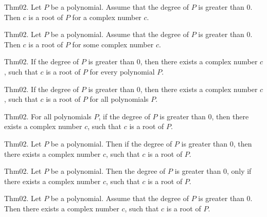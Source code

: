 \documentclass{article}
\begin{document}
Thm02. Let $P$ be a polynomial. Assume that the degree of $P$ is greater than $0$. Then $c$ is a root of $P$ for a complex number $c$.

Thm02. Let $P$ be a polynomial. Assume that the degree of $P$ is greater than $0$. Then $c$ is a root of $P$ for some complex number $c$.

Thm02. If the degree of $P$ is greater than $0$, then there exists a complex number $c$, such that $c$ is a root of $P$ for every polynomial $P$.

Thm02. If the degree of $P$ is greater than $0$, then there exists a complex number $c$, such that $c$ is a root of $P$ for all polynomials $P$.

Thm02. For all polynomials $P$, if the degree of $P$ is greater than $0$, then there exists a complex number $c$, such that $c$ is a root of $P$.

Thm02. Let $P$ be a polynomial. Then if the degree of $P$ is greater than $0$, then there exists a complex number $c$, such that $c$ is a root of $P$.

Thm02. Let $P$ be a polynomial. Then the degree of $P$ is greater than $0$, only if there exists a complex number $c$, such that $c$ is a root of $P$.

Thm02. Let $P$ be a polynomial. Assume that the degree of $P$ is greater than $0$. Then there exists a complex number $c$, such that $c$ is a root of $P$.
\end{document}
